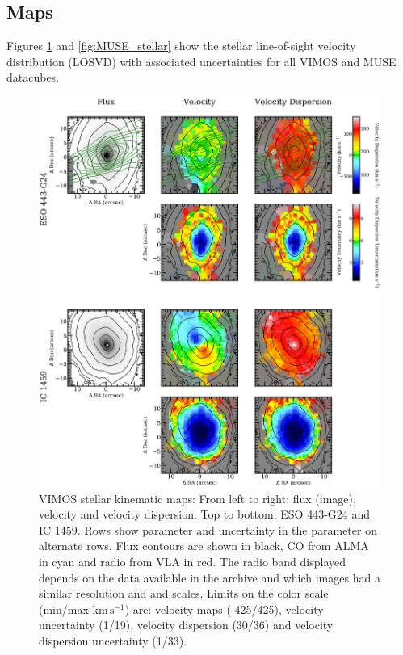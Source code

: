 	\subsection{Maps}
		\label{subsec:maps}
		Figures \ref{fig:VIMOS_stellar} and \ref{fig:MUSE_stellar} show the stellar line-of-sight velocity distribution (LOSVD) with associated uncertainties for all VIMOS and MUSE datacubes.

		\begin{figure}
			\centering
			\includegraphics[height=0.62\textheight]{chapter4/vimos/kin1.png}
			\caption[VIMOS stellar kinematic maps]{VIMOS stellar kinematic maps: From left to right: flux (image), velocity and velocity dispersion. Top to bottom: ESO 443-G24 and IC 1459. Rows show parameter and uncertainty in the parameter on alternate rows. Flux contours are shown in black, CO from ALMA in cyan and radio from VLA in red. The radio band displayed depends on the data available in the archive and which images had a similar resolution and and scales. Limits on the color scale (min/max $\mathrm{km \, s^{-1}}$) are: velocity maps (-425/425), velocity uncertainty (1/19), velocity dispersion (30/36) and velocity dispersion uncertainty (1/33).} 
			\label{fig:VIMOS_stellar}
		\end{figure}
